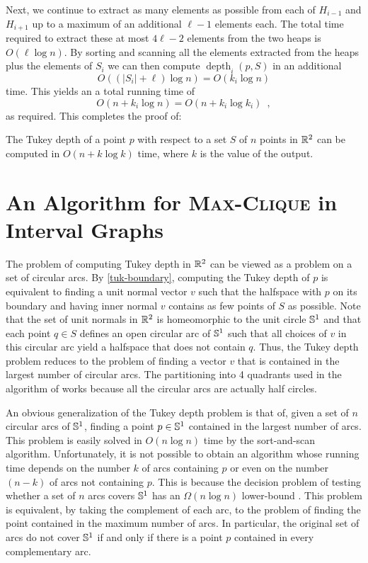 \documentclass[charterfonts,lotsofwhite]{patmorin}
\DeclareMathOperator{\td}{depth}
\begin{document}
Next, we continue to extract as many elements as possible from each of
$H_{i-1}$ and $H_{i+1}$ up to a maximum of an additional $\ell-1$
elements each. The total time required to extract these at most
$4\ell-2$ elements from the two heaps is $O(\ell\log n)$.  By sorting and
scanning all the elements extracted from the heaps plus the elements of
$S_i$ we can then compute $\td_i(p,S)$ in an additional
\[
     O((|S_i|+\ell)\log n) = O(k_i\log n)
\] 
time.  This yields an a total running time of 
\[  
   O(n + k_i\log n) = O(n + k_i\log k_i) \enspace ,
\]
as required.  This completes the proof of:

\begin{thm}
The Tukey depth of a point $p$ with respect to a set $S$ of $n$ points
in $\mathbb{R}^2$ can be computed in $O(n + k\log k)$ time, where
$k$ is the value of the output.
\end{thm}

\section{An Algorithm for \textsc{Max-Clique} in Interval Graphs}

The problem of computing Tukey depth in $\mathbb{R}^2$ can be viewed as a
problem on a set of circular arcs.  By \eqref{tuk-boundary}, computing
the Tukey depth of $p$ is equivalent to finding a unit normal vector
$v$ such that the halfspace with $p$ on its boundary and having inner
normal $v$ contains as few points of $S$ as possible.  Note that the
set of unit normals in $\mathbb{R}^2$ is homeomorphic to the unit circle
$\mathbb{S}^1$ and that each point $q\in S$ defines an open circular arc of $\mathbb{S}^1$
such that all choices of $v$ in this circular arc yield a halfspace
that does not contain $q$.  Thus, the Tukey depth problem reduces to
the problem of finding a vector $v$ that is contained in the largest
number of circular arcs. The partitioning into 4 quadrants used in
the algorithm of  works because all the circular arcs are
actually half circles.

An obvious generalization of the Tukey depth problem is that of, given
a set of $n$ circular arcs of $\mathbb{S}^1$, finding a point $p\in\mathbb{S}^1$
contained in the largest number of arcs.  This problem is easily
solved in $O(n\log n)$ time by the sort-and-scan algorithm.
Unfortunately, it is not possible to obtain an algorithm whose running
time depends on the number $k$ of arcs containing $p$ or even on the
number $(n-k)$ of arcs not containing $p$.  This is because the
decision problem of testing whether a set of $n$ arcs covers $\mathbb{S}^1$
has an $\Omega(n\log n)$ lower-bound \cite{b-o83}.  This problem is
equivalent, by taking the complement of each arc, to the problem of
finding the point contained in the maximum number of arcs.  In
particular, the original set of arcs do not cover $\mathbb{S}^1$ if and only
if there is a point $p$ contained in every complementary arc.
\end{document}
